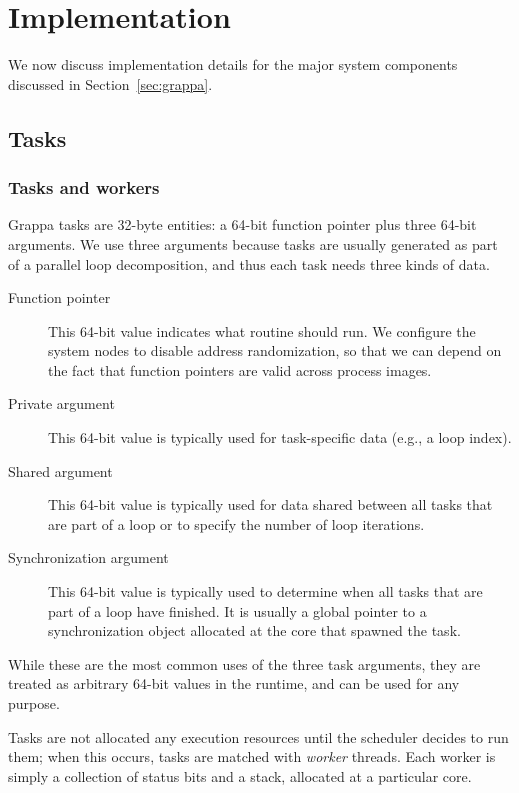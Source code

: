 \section{Implementation} \label{sec:implementation}

We now discuss implementation details for the major system components discussed in Section~\ref{sec:grappa}.

\subsection{Tasks}

\subsubsection{Tasks and workers}

Grappa tasks are 32-byte entities: a 64-bit function pointer plus
three 64-bit arguments. We use three arguments because tasks are
usually generated as part of a parallel loop decomposition, and thus
each task needs three kinds of data.
\begin{description}
\item[Function pointer] This 64-bit value indicates what routine
  should run. We configure the system nodes to disable address randomization, so that we can depend on the fact that function pointers are valid across process images.
\item[Private argument] This 64-bit value is typically used for task-specific
  data (e.g., a loop index).
\item[Shared argument] This 64-bit value is typically used for data shared
  between all tasks that are part of a loop or to specify the number
  of loop iterations.
\item[Synchronization argument] This 64-bit value is typically used to determine
  when all tasks that are part of a loop have finished. It is usually
  a global pointer to a synchronization object allocated at the core
  that spawned the task.
\end{description}
While these are the most common uses of the three task arguments, they
are treated as arbitrary 64-bit values in the runtime, and can be used
for any purpose.

Tasks are not allocated any execution resources until the scheduler
decides to run them; when this occurs, tasks are matched with {\em
  worker} threads. Each worker is simply a collection of status bits and a
stack, allocated at a particular core.

